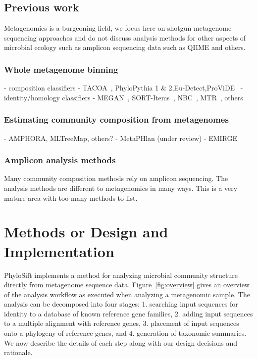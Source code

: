\documentclass[10pt]{article}
\begin{document}
\subsection*{Previous work}
Metagenomics is a burgeoning field, we focus here on shotgun metagenome sequencing approaches and 
do not discuss analysis methods for other aspects of microbial ecology such as amplicon sequencing data such as QIIME and others. 
\subsubsection*{Whole metagenome binning}
- composition classifiers
  - TACOA~\cite{Diaz2009}, PhyloPythia 1 \& 2\cite{Patil2011},Eu-Detect\cite{Mohammed2011},ProViDE~\cite{Ghosh2011}
- identity/homology classifiers
  - MEGAN~\cite{Huson2007}, SORT-Items~\cite{Haque2009}, NBC~\cite{Rosen2011}, MTR~\cite{Gori2011}, others
\subsubsection*{Estimating community composition from metagenomes}
      - AMPHORA\cite{WuEisen2008}, MLTreeMap\cite{Stark2010}, others?
      - MetaPHlan (under review)
      - EMIRGE\cite{Miller2011}
\subsubsection*{Amplicon analysis methods}
Many community composition methods rely on amplicon sequencing. 
The analysis methods are different to metagenomics in many ways.
This is a very mature area with too many methods to list.

\section*{Methods or Design and Implementation}

PhyloSift implements a method for analyzing microbial community structure directly from metagenome sequence data.
Figure~\ref{fig:overview} gives an overview of the analysis workflow as executed when analyzing a metagenomic sample.
The analysis can be decomposed into four stages: 1. searching input sequences for identity to a database of known reference gene families, 2. adding input sequences to a multiple alignment with reference genes, 3. placement of input sequences onto a phylogeny of reference genes, and 4. generation of taxonomic summaries. We now describe the details of each step along with our design decisions and rationale.
 
\end{document}
